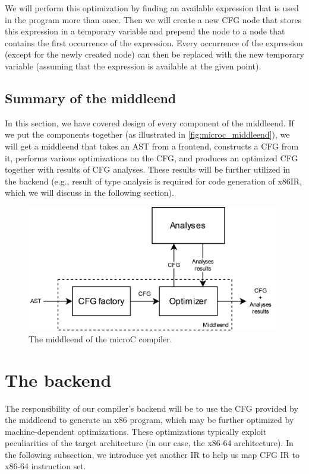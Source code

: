 \documentclass[thesis=M,english]{FITthesis}[2019/12/23]
\begin{document}
We will perform this optimization by finding an available expression that is used in the program more than once. Then we will create a new CFG node that stores this expression in a temporary variable and prepend the node to a node that contains the first occurrence of the expression. Every occurrence of the expression (except for the newly created node) can then be replaced with the new temporary variable (assuming that the expression is available at the given point).

\subsection{Summary of the middleend}
In this section, we have covered design of every component of the middleend. If we put the components together (as illustrated in \autoref{fig:microc_middleend}), we will get a middleend that takes an AST from a frontend, constructs a CFG from it, performs various optimizations on the CFG, and produces an optimized CFG together with results of CFG analyses. These results will be further utilized in the backend (e.g., result of type analysis is required for code generation of x86IR, which we will discuss in the following section).

\begin{figure}
    \centering
    \includegraphics[width=11cm]{img/microc_middleend.png}
    \caption{The middleend of the microC compiler.}\label{fig:microc_middleend}
\end{figure}

\section{The backend}
The responsibility of our compiler's backend will be to use the CFG provided by the middleend to generate an x86 program, which may be further optimized by machine-dependent optimizations. These optimizations typically exploit peculiarities of the target architecture \cite[Chap. 1.0]{comp_design} (in our case, the x86-64 architecture). In the following subsection, we introduce yet another IR to help us map CFG IR to x86-64 instruction set.
\end{document}
